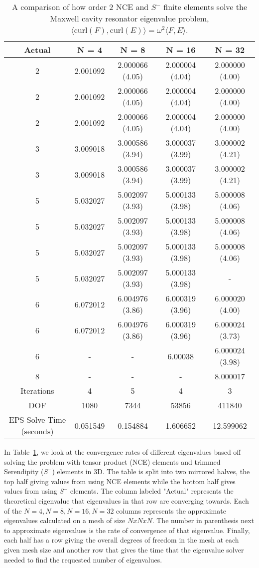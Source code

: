 \documentclass[manuscript,screen]{acmart}
\begin{document}
\begin{center}
\begin{table}
\begin{tabular}{ c c c c c }
Actual & N = 4 & N = 8 & N = 16 & N = 32 \\ 
\hline
2 &2.001092 & 2.000066 (4.05) & 2.000004 (4.04) & 2.000000 (4.00) \\  
2 & 2.001092 & 2.000066 (4.05) & 2.000004 (4.04) & 2.000000 (4.00)  \\
2 & 2.001092 & 2.000066 (4.05) & 2.000004 (4.04) & 2.000000 (4.00)\\
3 & 3.009018 & 3.000586 (3.94) & 3.000037 (3.99) & 3.000002 (4.21) \\
3 & 3.009018 & 3.000586 (3.94) & 3.000037 (3.99) & 3.000002 (4.21) \\
5 & 5.032027 & 5.002097 (3.93)& 5.000133 (3.98) & 5.000008 (4.06) \\
5 & 5.032027 & 5.002097 (3.93)& 5.000133 (3.98) & 5.000008 (4.06) \\
5 & 5.032027 & 5.002097 (3.93) & 5.000133 (3.98) & 5.000008 (4.06) \\
5 & 5.032027 & 5.002097 (3.93) & 5.000133 (3.98) & - \\
6 & 6.072012 & 6.004976 (3.86) & 6.000319 (3.96) & 6.000020 (4.00) \\
6 & 6.072012 & 6.004976 (3.86) & 6.000319 (3.96) & 6.000024 (3.73)\\
6 & - & - & 6.00038 & 6.000024 (3.98)\\
8 & - & - & - & 8.000017 \\
\hline
Iterations & 4 & 5 & 4 & 3 \\
\hline
DOF  & 1080 & 7344 & 53856 & 411840 \\
\hline
EPS Solve Time (seconds) & 0.051549 & 0.154884 & 1.606652 & 12.599062 \\
\hline

\end{tabular}
\caption{A comparison of how order 2 NCE and $S^-$ finite elements solve the Maxwell cavity resonator eigenvalue problem, $\langle \text{curl}(F), \text{curl}(E) \rangle = \omega^2 \langle F, E \rangle$. }  
\label{tab:Eigenvalue}
\end{table}
\end{center}

In Table~\ref{tab:Eigenvalue}, we look at the convergence rates of different eigenvalues based off solving the problem with tensor product (NCE) elements and trimmed Serendipity ($S^-$) elements in 3D.  The table is split into two mirrored halves, the top half giving values from using NCE elements while the bottom half gives values from using $S^-$ elements.  The column labeled "Actual" represents the theoretical eigenvalue that eigenvalues in that row are converging towards.  Each of the $N=4, N=8, N=16, N=32$ columns represents the approximate eigenvalues calculated on a mesh of size $N x N x N$.  The number in parenthesis next to approximate eigenvalues is the rate of convergence of that eigenvalue.  Finally, each half has a row giving the overall degrees of freedom in the mesh at each given mesh size and another row that gives the time that the eigenvalue solver needed to find the requested number of eigenvalues.
\end{document}
